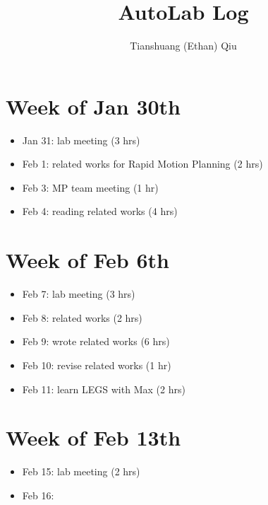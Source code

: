\documentclass[12pt]{article}
\author{Tianshuang (Ethan) Qiu}
\begin{document}
\title{AutoLab Log}
\maketitle

\section{Week of Jan 30th}
\begin{itemize}
    \item Jan 31: lab meeting (3 hrs)
    \item Feb 1: related works for Rapid Motion Planning (2 hrs)
    \item Feb 3: MP team meeting (1 hr)
    \item Feb 4: reading related works (4 hrs)
\end{itemize}


\section{Week of Feb 6th}
\begin{itemize}
    \item Feb 7: lab meeting (3 hrs)
    \item Feb 8: related works (2 hrs)
    \item Feb 9: wrote related works (6 hrs)
    \item Feb 10: revise related works (1 hr)
    \item Feb 11: learn LEGS with Max (2 hrs)
\end{itemize}


\section{Week of Feb 13th}
\begin{itemize}
    \item Feb 15: lab meeting (2 hrs)
    \item Feb 16:
\end{itemize}
\end{document}
